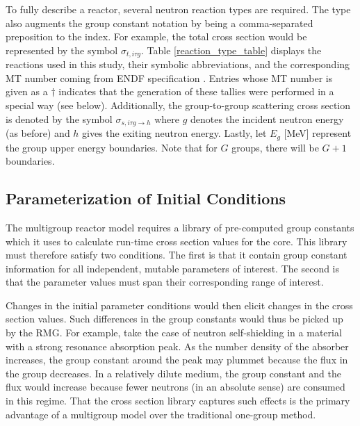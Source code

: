 To fully describe a reactor, several neutron reaction types are required.  The type 
also augments the group constant notation by being a comma-separated preposition to 
the index.  For example, the total cross section would be represented by the symbol 
$\sigma_{t,i\tau g}$. Table \ref{reaction_type_table} displays the reactions used in this 
study, their symbolic abbreviations, and the corresponding MT number coming from ENDF 
specification \cite{MFMT}.  Entries whose MT number is given as a $\dagger$ indicates 
that the generation of these tallies were performed in a special way (see below).
Additionally, the group-to-group scattering cross section is denoted by the symbol
$\sigma_{s,i\tau g\to h}$ where $g$ denotes the incident neutron energy (as before) and $h$
gives the exiting neutron energy.  Lastly, let $E_g$ [MeV] represent the group 
upper energy boundaries.  Note that for $G$ groups, there will be $G+1$ boundaries.

\subsection{Parameterization of Initial Conditions}
\label{mg_sec:param_ic}
The multigroup reactor model requires a library of pre-computed group constants which it uses
to calculate run-time cross section values for the core.  This library must therefore satisfy 
two conditions.  The first is that it contain group constant information for all independent, 
mutable parameters of interest.  The second is that the parameter values must span 
their corresponding range of interest.  

Changes in the initial parameter conditions would then elicit changes in the cross section 
values. Such differences in the group constants would thus be picked up by the RMG.  For example, 
take the case of neutron self-shielding in a material with a strong resonance absorption peak.  
As the number density of the absorber increases, the group constant around 
the peak may plummet because the flux in the group decreases.  In a relatively dilute medium, the group 
constant and the flux would increase because fewer neutrons (in an absolute sense) are consumed 
in this regime.  That the  cross section library captures such effects is the primary advantage 
of a multigroup model over the traditional one-group method.

